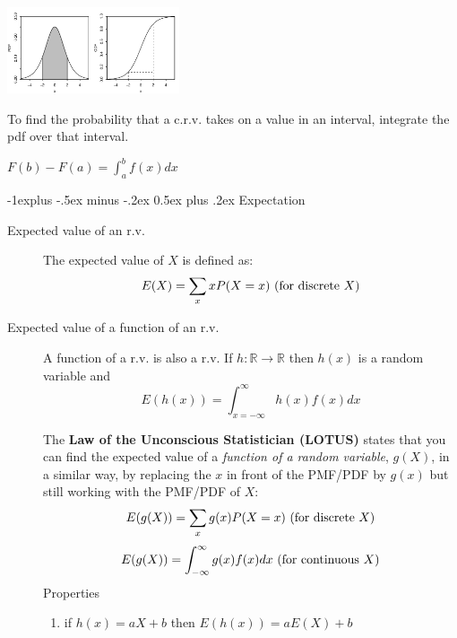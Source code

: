\documentclass[10pt,landscape]{article}
\makeatletter
\renewcommand{\subsection}{\@startsection{subsection}{2}{0mm}%
                                {-1explus -.5ex minus -.2ex}%
                                {0.5ex plus .2ex}%
                                {\normalfont\normalsize\bfseries}}
\makeatother
\begin{document}
\begin{multicols}{3}
\begin{description}
\begin{enumerate}
\begin{minipage}{\linewidth}
                \centering
    \includegraphics[width=2in]{figures/Logisticpdfcdf.pdf}
            \end{minipage}
       To find the probability that a c.r.v. takes on a value in an interval, integrate the pdf over that interval.
          \begin{center} 
        $F(b) - F(a) =  \int^b_a f(x)dx$
           \end{center}
    \end{enumerate}
\end{description}

\subsection{Expectation}
\begin{description}
  \item[Expected value of an r.v.]
  The expected value of $X$ is defined as:
  \[E(X) = \sum_x xP(X=x) \textnormal{ (for discrete $X$)}\]
  
  \item[Expected value of a function of an r.v.] A function of a r.v. is also a r.v. If $h:\mathbb{R}\rightarrow \mathbb{R}$  then $h(x)$ is a random variable and \\
  $$E(h(x))=\int_{x=-\infty}^\infty h(x)f(x)dx$$
  
The \textbf{Law of the Unconscious Statistician (LOTUS)} states that you can find the expected value of a \emph{function of a random variable}, $g(X)$, in a similar way, by replacing the $x$ in front of the PMF/PDF by $g(x)$ but still working with the PMF/PDF of $X$:
\[E(g(X)) = \sum_x g(x)P(X=x) \textnormal{ (for discrete $X$)}\]
\[E(g(X)) = \int^\infty_{-\infty}g(x)f(x)dx \textnormal{ (for continuous $X$)}\]
Properties
  \begin{enumerate}
    \item if $h(x) = aX+b$  then $E(h(x)) = aE(X)+b$
  \end{enumerate}
  

\end{description}
\end{multicols}
\end{document}
